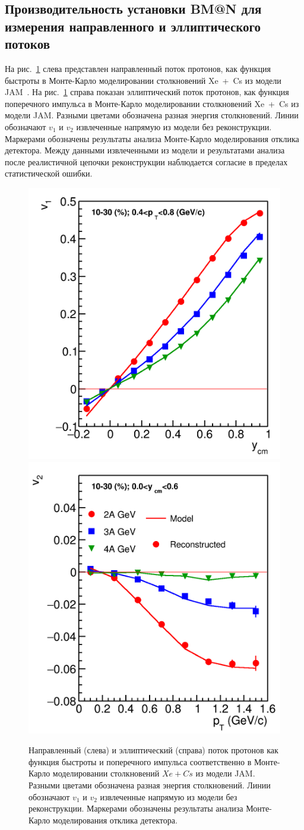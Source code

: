 \subsection{Производительность установки BM@N для измерения направленного и эллиптического потоков}

На рис.~\ref{fig:bmn_v1_v2} слева представлен направленный поток протонов, как функция быстроты в Монте-Карло моделировании столкновений Xe~+~Cs из модели JAM~\cite{Mamaev:2023yhz,Mamaev:2024}. 
На рис.~\ref{fig:bmn_v1_v2} справа показан эллиптический поток протонов, как функция поперечного импульса в Монте-Карло моделировании столкновений Xe~+~Cs из модели JAM. 
Разными цветами обозначена разная энергия столкновений. 
Линии обозначают $v_1$ и $v_2$ извлеченные напрямую из модели без реконструкции. 
Маркерами обозначены результаты анализа Монте-Карло моделирования отклика детектора.
Между данными извлеченными из модели и результатами анализа после реалистичной цепочки реконструкции наблюдается согласие в пределах статистической ошибки. 
%
\begin{figure}[ht]
\begin{center}
\includegraphics[width=0.45\linewidth]{images/v1_proton_tof_rapidity.png}
\includegraphics[width=0.45\linewidth]{images/v2_proton_tof_pT.png}
\caption{ 
    Направленный (слева) и эллиптический (справа) поток протонов как функция быстроты и поперечного импульса соответственно в Монте-Карло моделировании столкновений $Xe+Cs$ из модели JAM. Разными цветами обозначена разная энергия столкновений. Линии обозначают $v_1$ и $v_2$ извлеченные напрямую из модели без реконструкции. Маркерами обозначены результаты анализа Монте-Карло моделирования отклика детектора.
}
\label{fig:bmn_v1_v2}
\end{center}
\end{figure}

